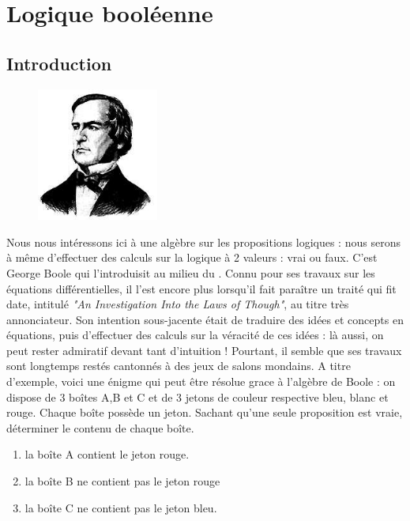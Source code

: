 \chapter{Logique booléenne}


\section{Introduction}

\begin{figure}
  \vspace{-20mm}
\includegraphics[width=4cm]{./figures/george_boole.jpg}
\end{figure}
Nous nous intéressons ici à une algèbre sur les propositions logiques : nous serons à même d'effectuer des calculs sur la logique à 2 valeurs : vrai ou faux.
C'est George Boole qui l'introduisit au milieu du . Connu pour ses travaux sur les équations différentielles, il l'est encore plus lorsqu'il fait paraître
un traité qui fit date, intitulé {\it "An Investigation Into the Laws of Though"}, au titre très annonciateur. Son intention sous-jacente était de traduire des
idées et concepts en équations, puis d'effectuer des calculs sur la véracité de ces idées : là aussi, on peut rester admiratif devant tant d'intuition !
Pourtant, il semble que ses travaux sont longtemps restés cantonnés à des jeux de salons mondains.
A titre d'exemple, voici une énigme qui peut être résolue grace à l'algèbre de Boole :
on dispose de 3 boîtes A,B et C et de 3 jetons de couleur respective bleu, blanc et rouge. Chaque boîte possède un jeton. Sachant qu'une seule
proposition est vraie, déterminer le contenu de chaque boîte.

\begin{enumerate}
  \item la boîte A contient le jeton rouge.
  \item la boîte B ne contient pas le jeton rouge
  \item la boîte C ne contient pas le jeton bleu.
\end{enumerate}

